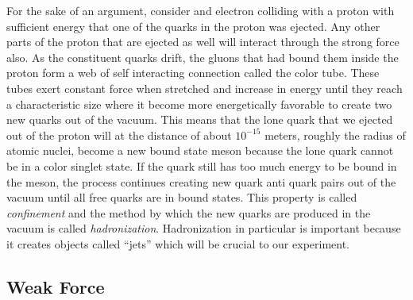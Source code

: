 For the sake of an argument, consider and electron colliding with a proton with sufficient energy that one of the quarks in the proton was ejected.
Any other parts of the proton that are ejected as well will interact through the strong force also. As the constituent quarks drift, the gluons that had bound them inside the proton form a web of self interacting connection called the color tube.
These tubes exert constant force when stretched and increase in energy until they reach a characteristic size where it become more energetically favorable to create two new quarks out of the vacuum.
This means that the lone quark that we ejected out of the proton will at the distance of about $10^{-15}$ meters, roughly the radius of atomic nuclei, become a new bound state meson because the lone quark cannot be in a color singlet state. 
If the quark still has too much energy to be bound in the meson, the process continues creating new quark anti quark pairs out of the vacuum until all free quarks are in bound states.
This property is called \textit{confinement} and the method by which the new quarks are produced in the vacuum is called \textit{hadronization}. 
Hadronization in particular is important because it creates objects called ``jets'' which will be crucial to our experiment.


\subsection{Weak Force}

